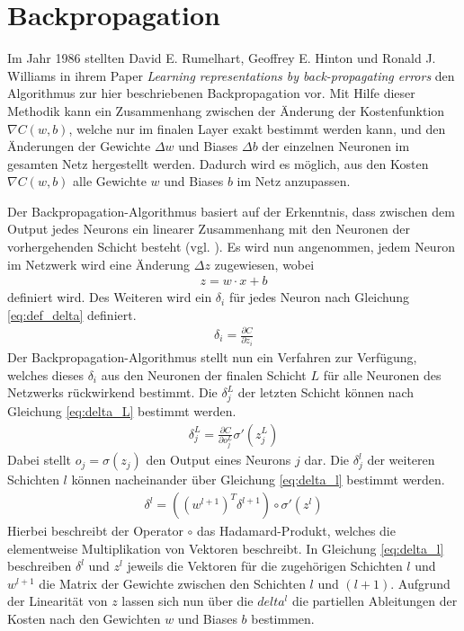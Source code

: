 \documentclass[../main.tex]{subfiles}
\begin{document}
\section{Backpropagation}
Im Jahr 1986 stellten David E. Rumelhart, Geoffrey E. Hinton und Ronald J. Williams in ihrem Paper \emph{Learning representations by back-propagating errors} den Algorithmus zur hier beschriebenen Backpropagation vor. Mit Hilfe dieser Methodik kann ein Zusammenhang zwischen der Änderung der Kostenfunktion $\nabla C(w,b)$, welche nur im finalen Layer exakt bestimmt werden kann, und den Änderungen der Gewichte $\Delta w$ und Biases $\Delta b$ der einzelnen Neuronen im gesamten Netz hergestellt werden. Dadurch wird es möglich, aus den Kosten $\nabla C(w,b)$ alle Gewichte $w$ und Biases $b$ im Netz anzupassen. \par 
Der Backpropagation-Algorithmus basiert auf der Erkenntnis, dass zwischen dem Output jedes Neurons ein linearer Zusammenhang mit den Neuronen der vorhergehenden Schicht besteht (vgl. \cite{BACKPROP_1986}). Es wird nun angenommen, jedem Neuron im Netzwerk wird eine Änderung $\Delta z$ zugewiesen, wobei \begin{align}\label{eq:def_z}z = w\cdot x + b\end{align} definiert wird. Des Weiteren wird ein $\delta_i$ für jedes Neuron nach Gleichung \ref{eq:def_delta} definiert.
\begin{align}
	\delta_i = \frac{\partial C}{\partial z_i} \label{eq:def_delta}
\end{align}
Der Backpropagation-Algorithmus stellt nun ein Verfahren zur Verfügung, welches dieses $\delta_i$ aus den Neuronen der finalen Schicht $L$ für alle Neuronen des Netzwerks rückwirkend bestimmt. Die $\delta_j^L$ der letzten Schicht können nach Gleichung \ref{eq:delta_L} bestimmt werden.
\begin{align}
	\delta_j^L = \frac{\partial C}{\partial o_j^L}\sigma'(z_j^L) \label{eq:delta_L}
\end{align}
Dabei stellt $o_j = \sigma(z_j)$ den Output eines Neurons $j$ dar. Die $\delta_j^l$ der weiteren Schichten $l$ können nacheinander über Gleichung \ref{eq:delta_l} bestimmt werden.
\begin{align}
	\delta^l = ((w^{l+1})^T\delta^{l+1}) \circ \sigma'(z^l) \label{eq:delta_l}
\end{align}
Hierbei beschreibt der Operator $\circ$ das Hadamard-Produkt, welches die elementweise Multiplikation von Vektoren beschreibt. In Gleichung \ref{eq:delta_l} beschreiben $\delta^l$ und $z^l$ jeweils die Vektoren für die zugehörigen Schichten $l$ und $w^{l+1}$ die Matrix der Gewichte zwischen den Schichten $l$ und $(l+1)$. Aufgrund der Linearität von $z$ lassen sich nun über die $delta^l$ die partiellen Ableitungen der Kosten nach den Gewichten $w$ und Biases $b$ bestimmen.
\end{document}
